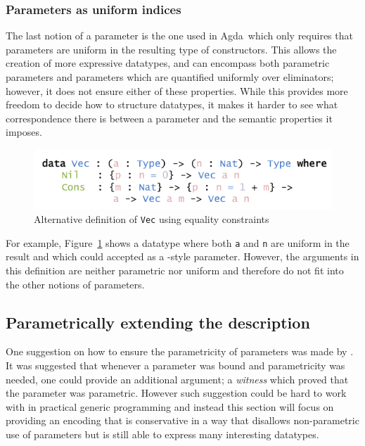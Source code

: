 \documentclass{ituthesis}
\newcommand{\tttype}[1]{\textcolor{type-color}{\texttt{#1}}}
\newcommand{\ttvar}[1]{\textcolor{local-var-color}{\texttt{#1}}}
\theoremstyle{break}
\begin{document}
\subsubsection{Parameters as uniform indices}
\label{ssub:Parameters as uniform indices}
The last notion of a parameter is the one used in Agda\,\autocite{norell2009dependently} which only requires that parameters are uniform in the resulting type of constructors.
This allows the creation of more expressive datatypes, and can encompass both parametric parameters and parameters which are quantified uniformly over eliminators; however, it does not ensure either of these properties.
While this provides more freedom to decide how to structure datatypes, it makes it harder to see what correspondence there is between a parameter and the semantic properties it imposes.

\begin{figure}[ht]
\begin{center}
    \includegraphics[scale=0.5]{Figures/VectorAlternativeDeclaration.png}
\end{center}
\caption{Alternative definition of \tttype{Vec} using equality constraints}
\label{fig:altvecdecl}
\end{figure}

For example, Figure~\ref{fig:altvecdecl} shows a datatype where both \ttvar{a} and \ttvar{n} are uniform in the result and which could accepted as a \citeauthor{norell2009dependently}-style parameter.
However, the arguments in this definition are neither parametric nor uniform and therefore do not fit into the other notions of parameters.


\subsection{Parametrically extending the description}
\label{sub:Parametrically extending the description}
One suggestion on how to ensure the parametricity of parameters was made by \textcite{bernardy2011theory}.
It was suggested that whenever a parameter was bound and parametricity was needed, one could provide an additional argument;
a \textit{witness} which proved that the parameter was parametric.
However such suggestion could be hard to work with in practical generic programming and instead this section will focus on providing
an encoding that is conservative in a way that disallows non-parametric use of parameters but is still able to express many interesting datatypes.
\end{document}
